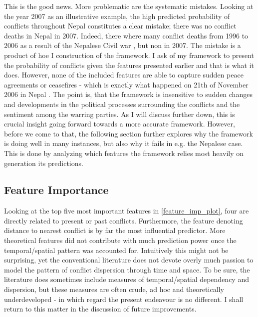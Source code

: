 \documentclass[a4paper]{article}
\begin{document}
This is the good news. More problematic are the systematic mistakes. Looking at the year 2007 as an illustrative example, the high predicted probability of conflicts throughout Nepal constitutes a clear mistake; there was no conflict deaths in Nepal in 2007. Indeed, there where many conflict deaths from 1996 to 2006 as a result of the Nepalese Civil war \citep{ohchr2012nepal}, but non in 2007. The mistake is a product of hoe I construction of the framework. I ask of my framework to present the probability of conflicts given the features presented earlier and that is what it does. However, none of the included features are able to capture sudden peace agreements or ceasefires - which is exactly what happened on 21th of November 2006 in Nepal \citep{ohchr2012nepal}. The point is, that the framework is insensitive to sudden changes and developments in the political processes surrounding the conflicts and the sentiment among the warring parties. As I will discuss further down, this is crucial insight going forward towards a more accurate framework. However, before we come to that, the following section further explores why the framework is doing well in many instances, but also why it fails in e.g. the Nepalese case. This is done by analyzing which features the framework relies most heavily on generation its predictions.\par

\subsection{Feature Importance}

Looking at the top five most important features in \autoref{feature_imp_plot}, four are directly related to present or past conflicts. Furthermore, the feature denoting distance to nearest conflict is by far the most influential predictor. More theoretical features did not contribute with much prediction power once the temporal/spatial pattern was accounted for. Intuitively this might not be surprising, yet the conventional literature does not devote overly much passion to model the pattern of conflict dispersion through time and space. To be sure, the literature does sometimes include measures of temporal/spatial dependency and dispersion, but these measures are often crude, ad hoc and theoretically underdeveloped - in which regard the present endeavour is no different. I shall return to this matter in the discussion of future improvements.\par
\end{document}
